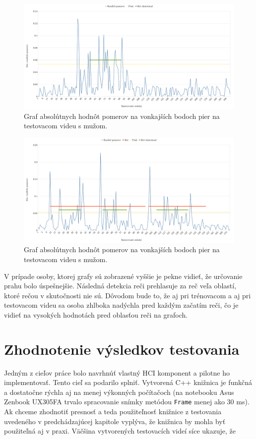 \begin{figure}[H]
	\begin{center}
		\includegraphics[width=\textwidth]{pics/kajtanTrening.png}
		\caption{Graf absolútnych hodnôt pomerov na vonkajších bodoch pier na testovacom videu s mužom.}
		\label{pic-kajtanTrening}
	\end{center}
\end{figure}

\begin{figure}[H]
	\begin{center}
		\includegraphics[width=\textwidth]{pics/kajtanTest.png}
		\caption{Graf absolútnych hodnôt pomerov na vonkajších bodoch pier na testovacom videu s mužom.}
		\label{pic-kajtanTest}
	\end{center}
\end{figure}
V prípade osoby, ktorej grafy sú zobrazené vyššie je pekne vidieť, že určovanie prahu bolo úspešnejšie.
Následná detekcia reči prehlasuje za reč veľa oblastí, ktoré rečou v skutočnosti nie sú.
Dôvodom bude to, že aj pri trénovacom a aj pri testovacom videu sa osoba zhlboka nadýchla pred každým začatím reči, čo je vidieť na vysokých hodnotách pred oblasťou reči na grafoch.

\section{Zhodnotenie výsledkov testovania}
Jedným z cieľov práce bolo navrhnúť vlastný HCI komponent a pilotne ho implementovať.
Tento cieľ sa podarilo splniť.
Vytvorená C++ knižnica je funkčná a dostatočne rýchla aj na menej výkonných počítačoch (na notebooku Asus  Zenbook UX305FA trvalo spracovanie snímky metódou \texttt{Frame} menej ako 30 ms). 
Ak chceme zhodnotiť presnosť a teda použiteľnosť knižnice z testovania uvedeného v predchádzajúcej kapitole vyplýva, že knižnica by mohla byť použiteľná aj v praxi.
Väčšina vytvorených testovacích videí síce ukazuje, že 
